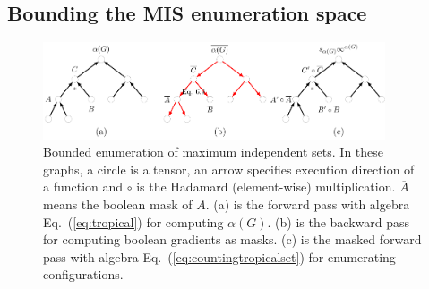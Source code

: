 \documentclass[onefignum, onetabnum]{siamart190516}
\newcommand{\<}{\langle}
\renewcommand{\>}{\rangle}
\newcommand{\Eq}[1]{Eq.~(\ref{#1})}
\begin{document}
\subsection{Bounding the MIS enumeration space}
\begin{figure}
    \centering
    \includegraphics[width=0.9\textwidth, trim={0cm 0cm 0cm 0cm}, clip]{figures/masktree.pdf}
    \caption{Bounded enumeration of maximum independent sets. In these graphs, a circle is a tensor, an arrow specifies execution direction of a function and $\circ$ is the Hadamard (element-wise) multiplication. $\overline A$ means the boolean mask of $A$. (a) is the forward pass with algebra \Eq{eq:tropical} for computing $\alpha(G)$.
     (b) is the backward pass for computing boolean gradients as masks.
     (c) is the masked forward pass with algebra \Eq{eq:countingtropicalset} for enumerating configurations.}
     \label{fig:bounding}
\end{figure}
\end{document}
